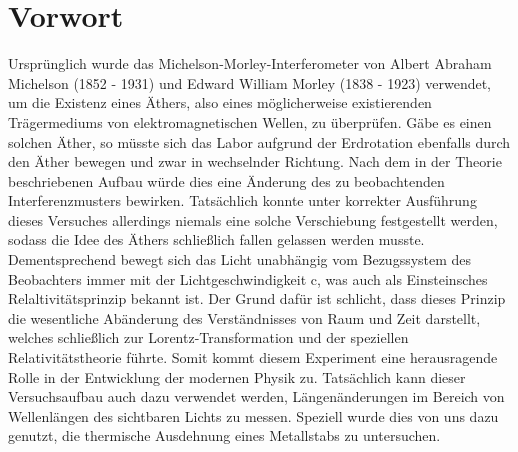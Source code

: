 \section{Vorwort}
Ursprünglich wurde das Michelson-Morley-Interferometer von Albert Abraham Michelson (1852 - 1931) und Edward William 
Morley (1838 - 1923) verwendet, um die Existenz eines Äthers, also eines möglicherweise existierenden Trägermediums von elektromagnetischen Wellen, 
zu überprüfen. Gäbe es einen solchen Äther, so müsste sich das Labor aufgrund der Erdrotation ebenfalls durch den Äther 
bewegen und zwar in wechselnder Richtung. Nach dem in der Theorie beschriebenen Aufbau würde dies eine Änderung des zu 
beobachtenden Interferenzmusters bewirken. Tatsächlich konnte unter korrekter Ausführung dieses Versuches allerdings 
niemals eine solche Verschiebung festgestellt werden, sodass die Idee des Äthers schließlich fallen gelassen werden 
musste. Dementsprechend bewegt sich das Licht unabhängig vom Bezugssystem des Beobachters immer mit der 
Lichtgeschwindigkeit c, was auch als Einsteinsches Relaltivitätsprinzip bekannt ist. Der Grund dafür ist schlicht, 
dass dieses Prinzip die wesentliche Abänderung des Verständnisses von Raum und Zeit darstellt, welches schließlich zur 
Lorentz-Transformation und der speziellen Relativitätstheorie führte. Somit kommt diesem Experiment eine herausragende Rolle 
in der Entwicklung der modernen Physik zu. Tatsächlich kann dieser Versuchsaufbau auch dazu verwendet werden, 
Längenänderungen im Bereich von Wellenlängen des sichtbaren Lichts zu messen. Speziell wurde dies von uns dazu genutzt, 
die thermische Ausdehnung eines Metallstabs zu untersuchen. 
